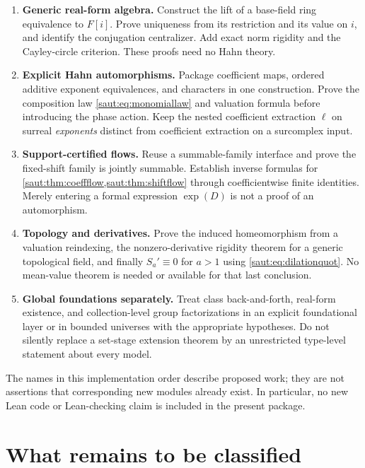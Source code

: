 \documentclass[11pt]{article}
\theoremstyle{definition}
\theoremstyle{remark}
\numberwithin{equation}{section}
\begin{document}
\begin{enumerate}
\item \textbf{Generic real-form algebra.} Construct the lift of a base-field
ring equivalence to $F[i]$. Prove uniqueness from its restriction and its
value on $i$, and identify the conjugation centralizer. Add exact norm
rigidity and the Cayley-circle criterion. These proofs need no Hahn theory.

\item \textbf{Explicit Hahn automorphisms.} Package coefficient maps,
ordered additive exponent equivalences, and characters in one construction.
Prove the composition law \eqref{saut:eq:monomiallaw} and valuation formula before
introducing the phase action. Keep the nested coefficient extraction
$\ell$ on surreal \emph{exponents} distinct from coefficient extraction
on a surcomplex input.

\item \textbf{Support-certified flows.} Reuse a summable-family interface
and prove the fixed-shift family is jointly summable. Establish inverse
formulas for \cref{saut:thm:coeffflow,saut:thm:shiftflow} through coefficientwise finite
identities. Merely entering a formal expression $\exp(D)$ is not a proof of
an automorphism.

\item \textbf{Topology and derivatives.} Prove the induced homeomorphism
from a valuation reindexing, the nonzero-derivative rigidity theorem for a
generic topological field, and finally $S_a'\equiv0$ for $a>1$ using
\eqref{saut:eq:dilationquot}. No mean-value theorem is needed or available for
that last conclusion.

\item \textbf{Global foundations separately.} Treat class back-and-forth,
real-form existence, and collection-level group factorizations in an
explicit foundational layer or in bounded universes with the appropriate
hypotheses. Do not silently replace a set-stage extension theorem by an
unrestricted type-level statement about every model.
\end{enumerate}

The names in this implementation order describe proposed work; they are
not assertions that corresponding new modules already exist. In particular,
no new Lean code or Lean-checking claim is included in the present package.

\section{What remains to be classified}\label{saut:sec:questions}
\end{document}
